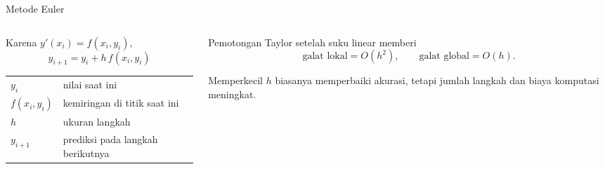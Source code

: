 \documentclass[aspectratio=169,10pt]{beamer}
\begin{document}
\begin{frame}{Metode Euler}
\scriptsize
\begin{columns}[T,totalwidth=\textwidth]
\begin{column}{.48\textwidth}
\begin{bluebox}
Karena $y'(x_i)=f(x_i,y_i)$,
\[
\boxed{y_{i+1}=y_i+h\,f(x_i,y_i)}
\]
\end{bluebox}
\begin{greenbox}
\begin{tabularx}{\linewidth}{lX}
$y_i$ & nilai saat ini\\
$f(x_i,y_i)$ & kemiringan di titik saat ini\\
$h$ & ukuran langkah\\
$y_{i+1}$ & prediksi pada langkah berikutnya
\end{tabularx}
\end{greenbox}
\end{column}
\begin{column}{.48\textwidth}
\begin{orangebox}
Pemotongan Taylor setelah suku linear memberi
\[
\text{galat lokal}=O(h^2),
\qquad
\text{galat global}=O(h).
\]
\end{orangebox}
\begin{purplebox}[Konsekuensi]
Memperkecil $h$ biasanya memperbaiki akurasi, tetapi jumlah langkah dan biaya komputasi meningkat.
\end{purplebox}
\end{column}
\end{columns}
\vspace{1mm}
\begin{center}
\end{center}
\end{frame}
\end{document}
